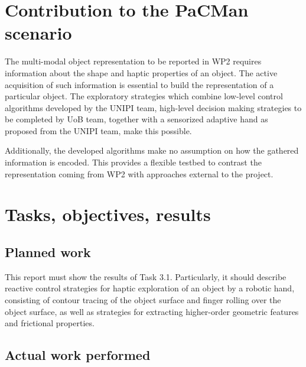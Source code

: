 \documentclass[a4paper,11pt,pdf]{pacmanreport}
\begin{document}
\section*{Contribution to the PaCMan scenario}

The multi-modal object representation to be reported in WP2 requires information about the shape and haptic properties of an object.
The active acquisition of such information is essential to build the representation of a particular object. The exploratory strategies which combine low-level control algorithms developed by the UNIPI team, high-level decision making strategies to be completed by UoB team, together with a sensorized adaptive hand as proposed from the UNIPI team, make this possible.

Additionally, the developed algorithms make no assumption on how the gathered information is encoded. This provides a flexible testbed to contrast the representation coming from WP2 with approaches external to the project.

\newpage

\section{Tasks, objectives, results}

\subsection{Planned work}

This report must show the results of Task 3.1. Particularly, it should describe reactive control strategies for haptic exploration of an object by a robotic hand, consisting of contour tracing of the object surface and finger rolling over the object surface, as well as strategies for extracting higher-order geometric features and frictional properties.


\subsection{Actual work performed}
\end{document}
